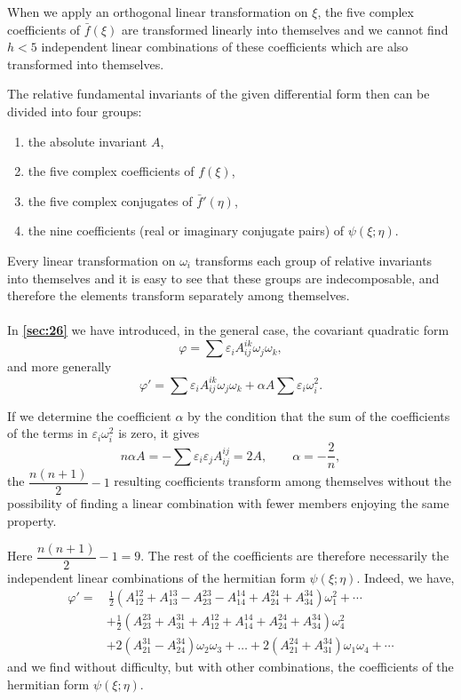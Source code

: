 \documentclass[leqno,12pt]{article}
\makeatletter
\let\old@phi\phi
\let\old@varphi\varphi
\let\old@epsilon\epsilon
\let\old@varepsilon\varepsilon
\let\phi\old@varphi
\let\varphi\old@phi
\let\epsilon\old@varepsilon
\let\varepsilon\old@epsilon
\theoremstyle{shape1}
\theoremstyle{shape0}
\theoremstyle{shape2}
\theoremstyle{definition}
\makeatother
\begin{document}
When we apply an orthogonal linear transformation on $\xi$, the five complex coefficients of $\bar f(\xi)$ are transformed linearly into themselves and we cannot find $h<5$ independent linear combinations of these coefficients which are also transformed into themselves.

The relative fundamental invariants of the given differential form then can be divided into four groups:
\begin{enumerate}
\item the absolute invariant $A$,
\item the five complex coefficients of $f(\xi)$,
\item the five complex conjugates of $\bar f'(\eta)$,
\item the nine coefficients (real or imaginary conjugate pairs) of $\psi(\xi;\eta)$.
\end{enumerate}

Every linear transformation on $\omega_{i}$ transforms each group of relative invariants into themselves and it is easy to see that these groups are indecomposable, and therefore the elements transform separately among themselves.

\paragraph{}
\label{sec:29}
In \textsection\textbf{\ref{sec:26}} we have introduced, in the general case, the covariant quadratic form
\[
\phi=\sum\epsilon_{i}A^{ik}_{ij}\omega_{j}\omega_{k},
\]
and more generally
\[
\phi'=\sum\epsilon_{i}A^{ik}_{ij}\omega_{j}\omega_{k}+\alpha A\sum\epsilon_{i}\omega_{i}^{2}.
\]

If we determine the coefficient $\alpha$ by the condition that the sum of the coefficients of the terms in $\epsilon_{i}\omega_{i}^{2}$ is zero, it gives
\[
n\alpha A=-\sum\epsilon_{i}\epsilon_{j}A^{ij}_{ij}=2A,\qquad\alpha=-\frac{2}{n},
\]
the $\dfrac{n(n+1)}{2}-1$ resulting coefficients transform among themselves without the possibility of finding a linear combination with fewer members enjoying the same property.

Here $\dfrac{n(n+1)}{2}-1=9$. The rest of the coefficients are therefore necessarily the independent linear combinations of the hermitian form $\psi(\xi;\eta)$. Indeed, we have, 
\begin{align*}
  \phi'=&\,\frac{1}{2}(A^{12}_{12}+A^{13}_{13}-A^{23}_{23}-A^{14}_{14}+A^{24}_{24}+A^{34}_{34})\omega^{2}_{1}+\cdots\\
  &+\frac{1}{2}(A^{23}_{23}+A^{31}_{31}+A^{12}_{12}+A^{14}_{14}+A^{24}_{24}+A^{34}_{34})\omega_{4}^{2}\\
  &+2(A^{31}_{21}-A^{34}_{24})\omega_{2}\omega_{3}+\dots+2(A^{24}_{21}+A^{34}_{31})\omega_{1}\omega_{4}+\cdots
\end{align*}
and we find without difficulty, but with other combinations, the coefficients of the hermitian form $\psi(\xi;\eta)$.
\end{document}
